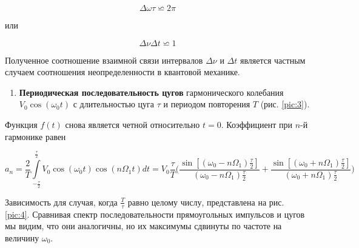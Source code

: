 \documentclass[a4paper,12pt]{article}
\begin{document}
\begin{equation*}
    \Delta \omega \tau \backsimeq 2 \pi
\end{equation*}

или

\begin{equation}\label{eq:5}
	\Delta \nu \Delta t \backsimeq 1
\end{equation}

Полученное соотношение взаимной связи интервалов $\Delta \nu$ и $\Delta t$ является частным случаем соотношения неопределенности в квантовой механике.

\begin{enumerate}[resume]
	\item \textbf{Периодическая последовательность цугов} гармонического колебания $V_{0}\cos(\omega_{0}t)$ с длительностью цуга $\tau$ и периодом повторения $T$ (рис. \ref{pic:3}).
\end{enumerate}

Функция $f(t)$ снова является четной относительно $t=0$. Коэффициент при $n$-й гармонике равен

\begin{equation}\label{eq:6}
    a_{n}=\dfrac{2}{T}\int\limits_{-\frac{\tau}{2}}^{\frac{\tau}{2}}V_{0}\cos(\omega_{0}t)\cos(n \Omega_{1} t)dt=V_{0}\dfrac{\tau}{T} \bigg(\dfrac{\sin[(\omega_{0}-n\Omega_{1})\frac{\tau}{2}]}{(\omega_{0}-n\Omega_{1})\frac{\tau}{2}}+\dfrac{\sin[(\omega_{0}+n\Omega_{1})\frac{\tau}{2}]}{(\omega_{0}+n\Omega_{1})\frac{\tau}{2}} \bigg)
\end{equation}

Зависимость для случая, когда $\frac{T}{\tau}$ равно целому числу, представлена на рис. \ref{pic:4}. Сравнивая спектр последовательности прямоугольных импульсов и цугов мы видим, что они аналогичны, но их максимумы сдвинуты по частоте на величину $\omega_{0}$.
\end{document}
